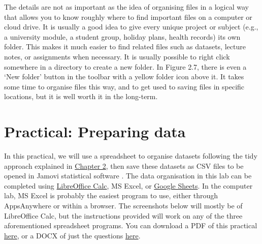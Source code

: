 \documentclass[
]{scrbook}
\begin{document}
The details are not as important as the idea of organising files in a logical way that allows you to know roughly where to find important files on a computer or cloud drive.
It is usually a good idea to give every unique project or subject (e.g., a university module, a student group, holiday plans, health records) its own folder.
This makes it much easier to find related files such as datasets, lecture notes, or assignments when necessary.
It is usually possible to right click somewhere in a directory to create a new folder.
In Figure 2.7, there is even a `New folder' button in the toolbar with a yellow folder icon above it.
It takes some time to organise files this way, and to get used to saving files in specific locations, but it is well worth it in the long-term.

\hypertarget{Chapter_3}{%
\chapter{Practical: Preparing data}\label{Chapter_3}}

In this practical, we will use a spreadsheet to organise datasets following the tidy approach explained in \protect\hyperlink{Chapter_2}{Chapter 2}, then save these datasets as CSV files to be opened in Jamovi statistical software \citep{Jamovi2022}.
The data organisation in this lab can be completed using \href{https://www.libreoffice.org/discover/calc/}{LibreOffice Calc}, MS Excel, or \href{https://docs.google.com/spreadsheets/}{Google Sheets}.
In the computer lab, MS Excel is probably the easiest program to use, either through AppsAnywhere or within a browser.
The screenshots below will mostly be of LibreOffice Calc, but the instructions provided will work on any of the three aforementioned spreadsheet programs.
You can download a PDF of this practical \href{https://bradduthie.github.io/SCIU4T4/chapters/chapter_3.pdf}{here}, or a DOCX of just the questions \href{https://bradduthie.github.io/SCIU4T4/practical_answers/Week1.docx}{here}.
\end{document}
